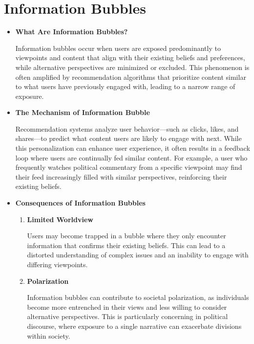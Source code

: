 \documentclass[10pt,twoside,slovak,a4paper]{article}
\begin{document}
\section{Information Bubbles} \label{Information Bubbles}
\begin{itemize}

\item \textbf{What Are Information Bubbles?} 

Information bubbles occur when users are exposed predominantly to viewpoints and content that align with their existing beliefs and preferences, while alternative perspectives are minimized or excluded\cite{boubble}. This phenomenon is often amplified by recommendation algorithms that prioritize content similar to what users have previously engaged with, leading to a narrow range of exposure.

\item \textbf{The Mechanism of Information Bubble} 

Recommendation systems analyze user behavior—such as clicks, likes, and shares—to predict what content users are likely to engage with next\cite{boubble}. While this personalization can enhance user experience, it often results in a feedback loop where users are continually fed similar content\cite{trouble}. For example, a user who frequently watches political commentary from a specific viewpoint may find their feed increasingly filled with similar perspectives, reinforcing their existing beliefs\cite{politics}.

\item \textbf{Consequences of Information Bubbles} 
\begin{enumerate}

\item \textbf{Limited Worldview}

Users may become trapped in a bubble where they only encounter information that confirms their existing beliefs\cite{trouble}. This can lead to a distorted understanding of complex issues and an inability to engage with differing viewpoints.

\item \textbf{Polarization}

Information bubbles can contribute to societal polarization, as individuals become more entrenched in their views and less willing to consider alternative perspectives\cite{politics}. This is particularly concerning in political discourse, where exposure to a single narrative can exacerbate divisions within society.


\end{enumerate}
\end{itemize}
\end{document}
